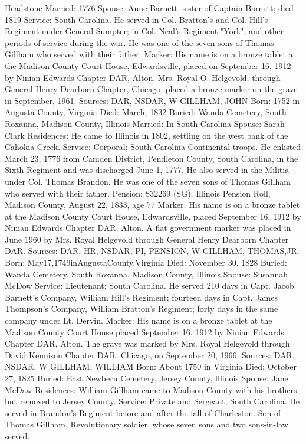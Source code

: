 Headstone Married: 1776 
Spouse: Anne Barnett, sister of Captain Barnett; died 1819 Service: South Carolina. He served in Col. Bratton's and Col. Hill's Regiment under General Sumpter; in Col. Neal's Regiment "York"; and other periods of service during the war. He was one of the seven sons of Thomas Gillham who served with their father. 
Marker: His name is on a bronze tablet at the Madison County Court House, Edwardsville, placed on September 16, 1912 by Ninian Edwards Chapter DAR, Alton. Mrs. Royal O. Helgevold, through General Henry Dearborn Chapter, Chicago, placed a bronze marker on the grave in September, 1961. 
Sources: DAR, NSDAR, W 
GILLHAM, JOHN 
Born: 1752 in Augusta County, Virginia 
Died: March, 1832 
Buried: Wanda Cemetery, South Roxanna, Madison County, Illinois 
Married: In South Carolina 
Spouse: Sarah Clark 
Residences: He came to Illinois in 1802, settling on the west bank of the Cahokia Creek. 
Service: Corporal; South Carolina Continental troops. He enlisted March 23, 1776 from Camden District, Pendleton County, South Carolina, in the Sixth Regi­ment and was discharged June 1, 1777. He also served in the Militia under Col. Thomas Brandon. He was one of the seven sons of Thomas Gillham who served with their father. 
Pension: S32269 (SG); Illinois Pension Roll, Madison County, August 22, 1833, age 77 
Marker: His name is on a bronze tablet at the Madison County Court House, Edwardsville, placed September 16, 1912 by Ninian Edwards Chapter DAR, Alton. A flat government marker was placed in June 1960 by Mrs. Royal Helgevold through General Henry Dearborn Chapter DAR. 
Sources: DAR, HR, NSDAR, PI, PENSION, W 
GILLHAM, THOMAS,JR. 
Born: May17,1749inAugustaCounty,Virginia 
Died: November 30, 1828 
Buried: Wanda Cemetery, South Roxanna, Madison County, Illinois 
Spouse: Susannah McDow 
Service: Lieutenant; South Carolina. He served 210 days in Capt. Jacob Barnett's Company, William Hill's Regiment; fourteen days in Capt. James Thompson's Company, William Bratton's Regiment; forty days in the same company under Lt. Dervin. 
Marker: His name is on a bronze tablet at the Madison County Court House placed September 16, 1912 by Ninian Edwards Chapter DAR, Alton. The grave was marked by Mrs. Royal Helgevold through David Kennison Chapter DAR, Chicago, on September 20, 1966. 
Sources: DAR, NSDAR, W 
GILLHAM, WILLIAM 
Born: About 1750 in Virginia 
Died: October 27, 1825 
Buried: East Newbern Cemetery, Jersey County, lllinois 
Spouse: Jane McDaw 
Residences: William Gillham came to Madison County with his brothers but removed to Jersey County. 
Service: Private and Sergeant; South Carolina. He served in Brandon's Regiment before and after the fall of Charleston. Son of Thomas Gillham, Revolution­ary soldier, whose seven sons and two sons-in-law served. 
